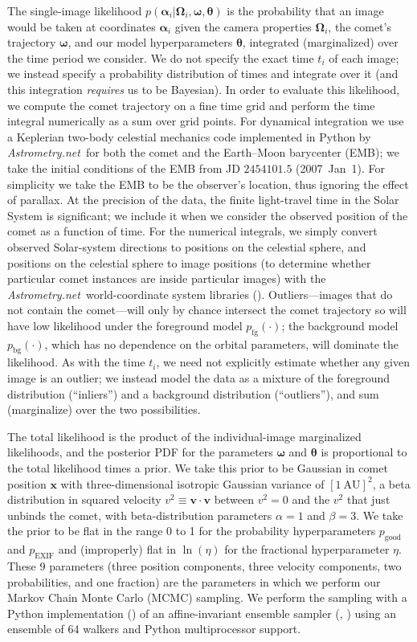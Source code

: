 \documentclass[12pt,preprint]{aastex}
\newcommand{\project}[1]{\textsl{#1}}
\newcommand{\An}{\project{Astrometry.net}}
\newcommand{\paramvector}[1]{\boldsymbol{#1}}
\newcommand{\pointing}{\paramvector{\alpha}}
\newcommand{\fovpars}{\paramvector{\Omega}}
\newcommand{\orbitpars}{\paramvector{\omega}}
\newcommand{\hyperpars}{\paramvector{\theta}}
\newcommand{\position}{\paramvector{x}}
\newcommand{\velocity}{\paramvector{v}}
\newcommand{\pgood}{p_\mathrm{good}}
\newcommand{\exif}{\mathrm{EXIF}}
\newcommand{\pexif}{p_\exif}
\newcommand{\pfg}{p_\mathrm{fg}}
\newcommand{\pbg}{p_\mathrm{bg}}
\newcommand{\unit}[1]{\mathrm{#1}}
\newcommand{\AU}{\unit{AU}}
\begin{document}
The single-image likelihood
$p(\pointing_i|\fovpars_i,\orbitpars,\hyperpars)$ is the probability
that an image would be taken at coordinates $\pointing_i$ given the
camera properties $\fovpars_i$, the comet's trajectory $\orbitpars$,
and our model hyperparameters $\hyperpars$, integrated (marginalized)
over the time period we consider.  We do not specify the exact time
$t_i$ of each image; we instead specify a probability distribution of
times and integrate over it (and this integration \emph{requires} us
to be Bayesian).
In order to evaluate this likelihood, we compute the comet trajectory
on a fine time grid and perform the time integral numerically as a sum
over grid points.  For dynamical integration we use a Keplerian two-body
celestial mechanics code implemented in Python by
\An\ for both the comet and the Earth--Moon barycenter (EMB); we take
the initial conditions of the EMB from JD $2454101.5$ (2007~Jan~1).
For simplicity we take the EMB to be the observer's location, thus
ignoring the effect of parallax.  At the precision of the data, the
finite light-travel time in the Solar System is significant; we
include it when we consider the observed position of the comet as a
function of time.  For the numerical integrals, we simply convert
observed Solar-system directions to positions on the celestial sphere,
and positions on the celestial sphere to image positions (to determine
whether particular comet instances are inside particular images) with
the \An~world-coordinate system libraries (\citealt{An}).
Outliers---images that do not contain the comet---will only by chance
intersect the comet trajectory so will have low likelihood under the
foreground model $\pfg(\cdot)$; the background model $\pbg(\cdot)$,
which has no dependence on the orbital parameters, will dominate the
likelihood.  As with the time $t_i$, we need not explicitly estimate
whether any given image is an outlier; we instead model the data as a
mixture of the foreground distribution (``inliers'') and a background
distribution (``outliers''), and sum (marginalize) over the two
possibilities.

The total likelihood is the product of the individual-image
marginalized likelihoods, and the posterior PDF for the parameters
$\orbitpars$ and $\hyperpars$ is proportional to the total likelihood
times a prior.  We take this prior to be Gaussian in comet position
$\position$ with three-dimensional isotropic Gaussian variance of
$[1~\AU]^2$, a beta distribution in squared velocity
$v^2\equiv\velocity\cdot\velocity$ between $v^2=0$ and the $v^2$ that
just unbinds the comet, with beta-distribution parameters $\alpha=1$
and $\beta=3$.  We take the prior to be flat in the range 0 to 1 for
the probability hyperparameters $\pgood$ and $\pexif$ and (improperly)
flat in $\ln(\eta)$ for the fractional hyperparameter $\eta$.  These 9
parameters (three position components, three velocity components, two
probabilities, and one fraction) are the parameters in which we
perform our Markov Chain Monte Carlo (MCMC) sampling.  We perform the
sampling with a Python implementation (\citealt{emcee})
of an affine-invariant ensemble sampler
(\citealt{sampler}, \citealt{hou}) using an ensemble of 64
walkers and Python multiprocessor support.
\end{document}
